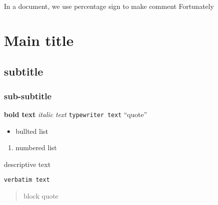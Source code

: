 \documentclass{article}
\begin{document}


In a \LaTex document, we use percentage sign to make comment
Fortunately \LaTex
\section*{Main title}
\subsection*{subtitle}
\subsubsection*{sub-subtitle}

\textbf{bold text}
\emph{italic text}
\texttt{typewriter text}
``quote''

\begin{itemize}
  \item bullted list
\end{itemize}

\begin{enumerate}
  \item numbered list
\end{enumerate}

\begin{description}
  \item[descriptive text]
\end{description}

\begin{verbatim}
verbatim text
\end{verbatim}

\begin{quote}
block quote
\end{quote}
\end{document}

